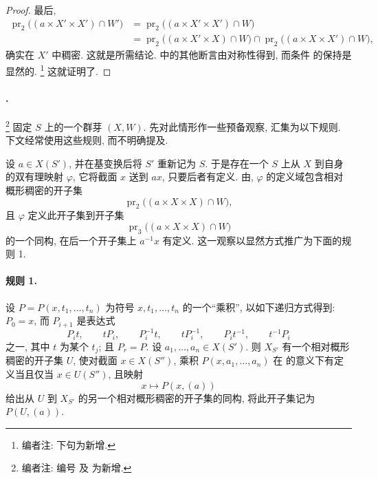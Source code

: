 \begin{proof}
最后,
\[
\begin{aligned}
  \operatorname{pr}_2\bigl((a\times X'\times X')\cap W'\bigr)
  &=
  \operatorname{pr}_2\bigl((a\times X'\times X')\cap W\bigr)\\
  &=
  \operatorname{pr}_2\bigl((a\times X'\times X)\cap W\bigr)
  \cap
  \operatorname{pr}_2\bigl((a\times X\times X')\cap W\bigr),
\end{aligned}
\]
确实在 \(X'\) 中稠密. 这就是所需结论.
 中的其他断言由对称性得到,
而条件 的保持是显然的.
\footnote{编者注: 下句为新增.}
这就证明了.
\end{proof}

\paragraph{.}
\footnote{编者注: 编号
及 为新增.}
固定 \(S\) 上的一个群芽 \((X,W)\).
先对此情形作一些预备观察, 汇集为以下规则.
下文经常使用这些规则, 而不明确提及.

设 \(a\in X(S')\), 并在基变换后将 \(S'\) 重新记为 \(S\).
于是存在一个 \(S\) 上从 \(X\) 到自身的双有理映射 \(\varphi\),
它将截面 \(x\) 送到 \(ax\), 只要后者有定义.
由,
\(\varphi\) 的定义域包含相对概形稠密的开子集
\[
  \operatorname{pr}_2\bigl((a\times X\times X)\cap W\bigr),
\]
且 \(\varphi\) 定义此开子集到开子集
\[
  \operatorname{pr}_3\bigl((a\times X\times X)\cap W\bigr)
\]
的一个同构, 在后一个开子集上 \(a^{-1}x\) 有定义.
这一观察以显然方式推广为下面的规则 1.

\paragraph{规则 1.}
设 \(P=P(x,t_1,\ldots,t_n)\) 为符号 \(x,t_1,\ldots,t_n\) 的一个“乘积”,
以如下递归方式得到: \(P_0=x\), 而 \(P_{i+1}\) 是表达式
\[
  P_i t,\qquad tP_i,\qquad P_i^{-1}t,\qquad
  tP_i^{-1},\qquad P_i t^{-1},\qquad t^{-1}P_i
\]
之一, 其中 \(t\) 为某个 \(t_j\); 且 \(P_r=P\).
设 \(a_1,\ldots,a_n\in X(S')\).
则 \(X_{S'}\) 有一个相对概形稠密的开子集 \(U\),
使对截面 \(x\in X(S'')\), 乘积 \(P(x,a_1,\ldots,a_n)\)
在 的意义下有定义当且仅当 \(x\in U(S'')\),
且映射
\[
  x\longmapsto P(x,(a))
\]
给出从 \(U\) 到 \(X_{S'}\) 的另一个相对概形稠密的开子集的同构,
将此开子集记为 \(P(U,(a))\).

